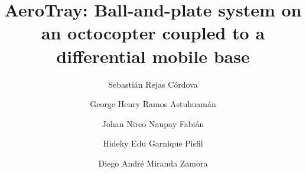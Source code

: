 \begin{frontmatter}

\title{AeroTray: Ball-and-plate system on an octocopter coupled to a differential mobile base}

\author[utec]{Sebastián Rejas Córdova}
\author[utec]{George Henry Ramos Astuhuamán}
\author[utec]{Johan Nireo Naupay Fabián}
\author[utec]{Hideky Edu Garnique Pisfil}
\author[utec]{Diego André Miranda Zamora}
\address[utec]{Department of Mechatronics Engineering, Universidad de Ingeniería y Tecnología (UTEC), Jr. Medrano Silva 165, Barranco, Lima, Peru}


\end{frontmatter}
